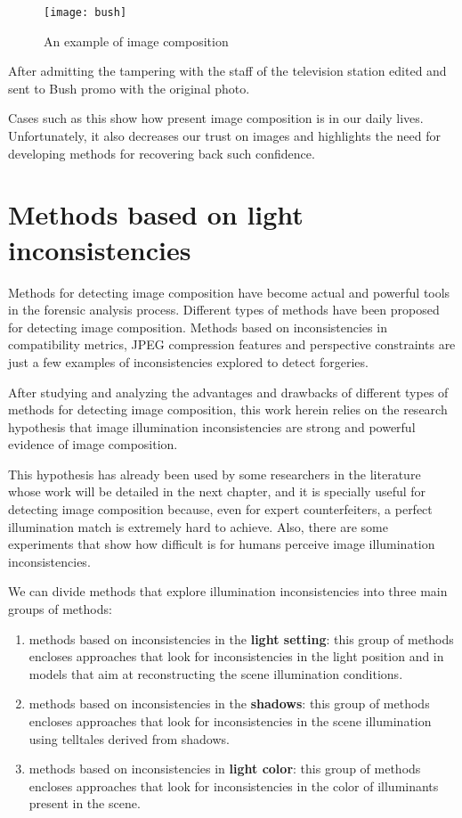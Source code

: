 \begin{wrapfigure}{r}{0.5\textwidth}
  \begin{center}
    \texttt{[image: bush]}
  \end{center}
  \caption{An example of image composition}
\end{wrapfigure}


After admitting the tampering with the staff of the television station edited and sent to Bush promo with the original photo.

Cases such as this show how present image composition is in our daily lives. Unfortunately, it also decreases our trust on images and highlights the need for developing methods for recovering back such confidence.

\section{Methods based on light inconsistencies}

Methods for detecting image composition have become actual and powerful tools in the forensic analysis process. Different types of methods have been proposed for detecting image composition. Methods based on inconsistencies in compatibility metrics, JPEG compression features and perspective constraints are just a few examples of inconsistencies explored to detect forgeries.

After studying and analyzing the advantages and drawbacks of different types of methods for detecting image composition, this work herein relies on the research hypothesis that image illumination inconsistencies are strong and powerful evidence of image composition.

This hypothesis has already been used by some researchers in the literature whose work will be detailed in the next chapter, and it is specially useful for detecting image composition because, even for expert counterfeiters, a perfect illumination match is extremely hard to achieve. Also, there are some experiments that show how difficult is for humans perceive image illumination inconsistencies.

We can divide methods that explore illumination inconsistencies into three main groups of methods:
\begin{enumerate}
\item methods based on inconsistencies in the \textbf{light setting}: this group of methods encloses approaches that look for inconsistencies in the light position and in models that aim at reconstructing the scene illumination conditions.
\item methods based on inconsistencies in the \textbf{shadows}: this group of methods encloses approaches that look for inconsistencies in the scene illumination using telltales derived from shadows.
\item methods based on inconsistencies in \textbf{light color}: this group of methods encloses approaches that look for inconsistencies in the color of illuminants present in the scene.
\end{enumerate}


